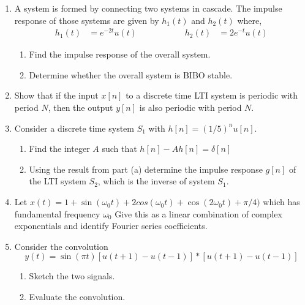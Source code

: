 \documentclass[12pt]{article}
\begin{document}
\begin{enumerate}
\begin{figure}[h]
    \centering
    
\caption{}
\end{figure}

\item A system is formed by connecting two systems in cascade. The impulse response of those systems are given by $h_{1}(t)$ and $h_{2}(t)$ where,
     \begin{align*}
        h_1(t) &= e^{-2t}u(t)&\hspace{2cm} h_2(t) &= 2e^{-t}u(t)
     \end{align*}
\begin{enumerate}
    \item Find the impulse response of the overall system.
    \item Determine whether the overall system is BIBO stable.
\end{enumerate}

\item Show that if the input $x[n]$ to a discrete time LTI system is periodic with period $N$, then the output $y[n]$ is also periodic with period $N$.

\item Consider a discrete time system $S_1$ with $h[n] = (1/5)^{n}u[n]$.

\begin{enumerate}
    \item Find the integer $A$ such that $ h[n] - Ah[n] = \delta[n] $
    \item Using the result from part (a) determine the impulse response $g[n]$ of the LTI system $S_2$, which is the inverse of system $S_1$.
\end{enumerate}

\item Let $x(t) = 1 + \sin(\omega_0t) + 2cos(\omega_0t) + \cos(2\omega_0t)+\pi/4)$ which has fundamental frequency $\omega_0$ Give this as a linear combination of complex exponentials and identify Fourier series coefficients.

\item Consider the convolution
        \begin{equation*}
            y(t) = \sin(\pi t) \left[u(t+1) - u(t-1)\right] \ast \left[u(t+1) - u(t-1)\right]
        \end{equation*}
        \begin{enumerate}
            \item Sketch the two signals.
            \item Evaluate the convolution.
        \end{enumerate}


\end{enumerate}

\end{document}
